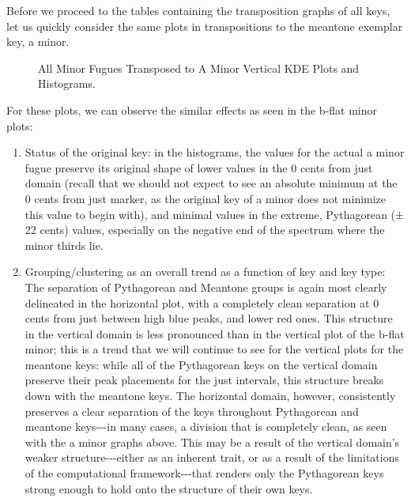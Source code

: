 Before we proceed to the tables containing the transposition graphs of
all keys, let us quickly consider the same plots in transpositions to
the meantone exemplar key, a minor.


    \begin{center}
    \end{center}
    


\begin{figure}[H]
    \begin{center}
    \caption{All Minor Fugues Transposed to A Minor Vertical KDE Plots and Histograms. }
    \end{center}
\end{figure}
    
    For these plots, we can observe the similar effects as seen in the
b-flat minor plots:

\begin{enumerate}
\def\labelenumi{\arabic{enumi}.}
\tightlist
\item
  Status of the original key: in the histograms, the values for the
  actual a minor fugue preserve its original shape of lower values in
  the 0 cents from just domain (recall that we should not expect to see
  an absolute minimum at the 0 cents from just marker, as the original
  key of a minor does not minimize this value to begin with), and
  minimal values in the extreme, Pythagorean (± 22 cents) values,
  especially on the negative end of the spectrum where the minor thirds
  lie.
\item
  Grouping/clustering as an overall trend as a function of key and key
  type: The separation of Pythagorean and Meantone groups is again most
  clearly delineated in the horizontal plot, with a completely clean
  separation at 0 cents from just between high blue peaks, and lower red
  ones. This structure in the vertical domain is less pronounced than in
  the vertical plot of the b-flat minor; this is a trend that we will
  continue to see for the vertical plots for the meantone keys: while
  all of the Pythagorean keys on the vertical domain preserve their peak
  placements for the just intervals, this structure breaks down with the
  meantone keys. The horizontal domain, however, consistently preserves
  a clear separation of the keys throughout Pythagorean and meantone
  keys-\/-\/-in many cases, a division that is completely clean, as seen
  with the a minor graphs above. This may be a result of the vertical
  domain's weaker structure-\/-\/-either as an inherent trait, or as a
  result of the limitations of the computational framework-\/-\/-that
  renders only the Pythagorean keys strong enough to hold onto the
  structure of their own keys.
\end{enumerate}

